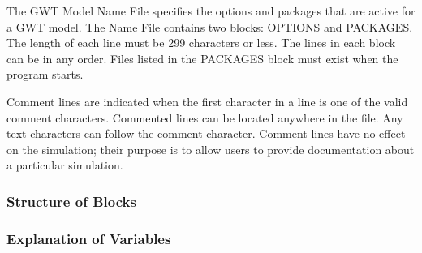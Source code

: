 The GWT Model Name File specifies the options and packages that are active for a GWT model.  The Name File contains two blocks: OPTIONS  and PACKAGES. The length of each line must be 299 characters or less. The lines in each block can be in any order.  Files listed in the PACKAGES block must exist when the program starts. 

Comment lines are indicated when the first character in a line is one of the valid comment characters.  Commented lines can be located anywhere in the file. Any text characters can follow the comment character. Comment lines have no effect on the simulation; their purpose is to allow users to provide documentation about a particular simulation. 

\vspace{5mm}
\subsubsection{Structure of Blocks}



\vspace{5mm}
\subsubsection{Explanation of Variables}
\begin{description}

\end{description}

